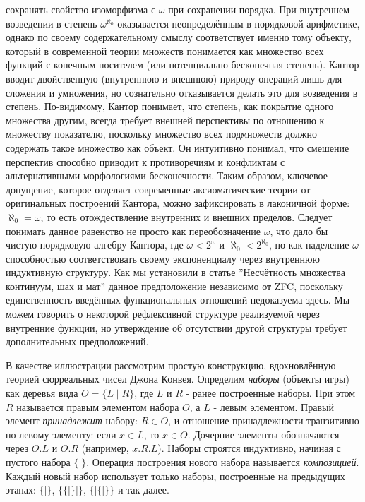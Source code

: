 \documentclass[12pt]{article}
\begin{document}
сохранять свойство изоморфизма с $\omega$ при сохранении порядка. При внутреннем возведении в степень $\omega^{\aleph_0}$ оказывается неопределённым в порядковой арифметике, однако по своему содержательному смыслу соответствует именно тому объекту, который в современной теории множеств понимается как множество всех функций с конечным носителем (или потенциально бесконечная степень). Кантор вводит двойственную (внутреннюю и внешнюю) природу операций лишь для сложения и умножения, но сознательно отказывается делать это для возведения в степень. По-видимому, Кантор понимает, что степень, как покрытие одного множества другим, всегда требует внешней перспективы по отношению к множеству показателю, поскольку множество всех подмножеств должно содержать такое множество как объект. Он интуитивно понимал, что смешение перспектив способно приводит к противоречиям и конфликтам с альтернативными морфологиями бесконечности. Таким образом, ключевое допущение, которое отделяет современные аксиоматические теории от оригинальных построений Кантора, можно зафиксировать в лаконичной форме: $\aleph_0 = \omega$, то есть отождествление внутренних и внешних пределов. Следует понимать данное равенство не просто как переобозначение $\omega$, что дало бы чистую порядковую алгебру Кантора, где $\omega < 2^{\omega}$ и $\aleph_0 < 2^{\aleph_0}$, но как наделение $\omega$ способностью соответствовать своему экспоненциалу через внутреннюю индуктивную структуру. Как мы установили в статье ''Несчётность множества континуум, шах и мат'' данное предположение независимо от ZFC, поскольку единственность введённых функциональных отношений недоказуема здесь. Мы можем говорить о некоторой рефлексивной структуре реализуемой через внутренние функции, но утверждение об отсутствии другой структуры требует дополнительных предположений. 

В качестве иллюстрации рассмотрим простую конструкцию, вдохновлённую теорией сюрреальных чисел Джона Конвея. Определим {\it наборы} (объекты игры) как деревья вида $O = \{L \mid R\}$, где $L$ и $R$ - ранее построенные наборы. При этом $R$ называется правым элементом набора $O$, а $L$ - левым элементом. Правый элемент {\it принадлежит} набору: $R \in O$, и отношение принадлежности транзитивно по левому элементу: если $x \in L$, то $x \in O$. Дочерние элементы обозначаются через $O.L$ и $O.R$ (например, $x.R.L$). Наборы строятся индуктивно, начиная с пустого набора $\{ \mid \}$. Операция построения нового набора называется {\it композицией}. Каждый новый набор использует только наборы, построенные на предыдущих этапах: $\{ \mid \}$, $\{ \{ \mid \} \mid \}$, $\{ \mid \{ \mid \} \}$ и так далее.
\end{document}
